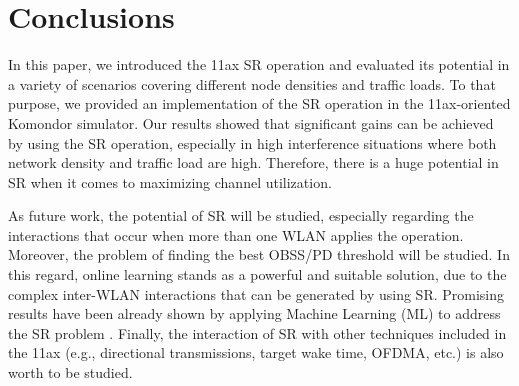 \documentclass[conference]{IEEEtran}
\begin{document}
	\section{Conclusions}
	In this paper, we introduced the 11ax SR operation and evaluated its potential in a variety of scenarios covering different node densities and traffic loads. To that purpose, we provided an implementation of the SR operation in the 11ax-oriented Komondor simulator. Our results showed that significant gains can be achieved by using the SR operation, especially in high interference situations where both network density and traffic load are high. Therefore, there is a huge potential in SR when it comes to maximizing channel utilization.
	
	As future work, the potential of SR will be studied, especially regarding the interactions that occur when more than one WLAN applies the operation. Moreover, the problem of finding the best OBSS/PD threshold will be studied. In this regard, online learning stands as a powerful and suitable solution, due to the complex inter-WLAN interactions that can be generated by using SR. Promising results have been already shown by applying Machine Learning (ML) to address the SR problem \cite{collaborative, potential}. Finally, the interaction of SR with other techniques included in the 11ax (e.g., directional transmissions, target wake time, OFDMA, etc.) is also worth to be studied.
	
\end{document}
